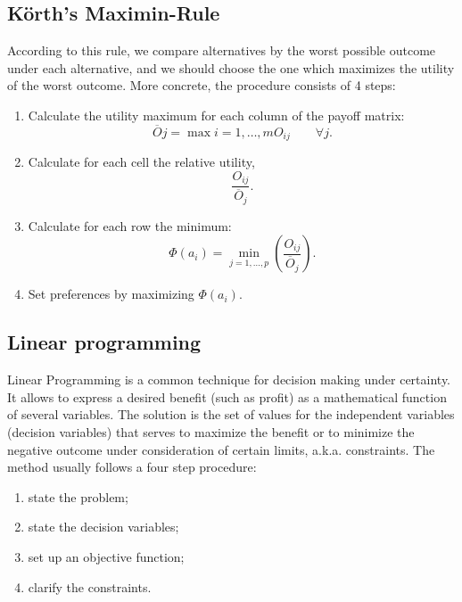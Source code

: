 \documentclass[
  12pt,
  oneside]{book}
\providecommand{\tightlist}{%
  \setlength{\itemsep}{0pt}\setlength{\parskip}{0pt}}
\theoremstyle{definition}
\theoremstyle{definition}
\theoremstyle{definition}
\theoremstyle{definition}
\theoremstyle{remark}
\begin{document}
\hypertarget{kuxf6rths-maximin-rule}{%
\subsection*{Körth's Maximin-Rule}\label{kuxf6rths-maximin-rule}}

According to this rule, we compare alternatives by the worst possible outcome under each alternative, and we should choose the one which maximizes the utility of the worst outcome. More concrete, the procedure consists of 4 steps:

\begin{enumerate}
\def\labelenumi{\arabic{enumi}.}
\tightlist
\item
  Calculate the utility maximum for each column of the payoff matrix: \[\overline{O}j=\max{i=1,\dots,m}{O_{ij}}\qquad \forall j.\]
\item
  Calculate for each cell the relative utility, \[\frac{O_{ij}}{\overline{O}_j}.\]
\item
  Calculate for each row the minimum: \[\Phi(a_i)=\min_{j=1,\dots,p}\left(\frac{O_{ij}}{\overline{O}_j}\right).\]
\item
  Set preferences by maximizing \(\Phi(a_i)\).
\end{enumerate}

\hypertarget{linear-programming}{%
\subsection{Linear programming}\label{linear-programming}}

Linear Programming is a common technique for decision making under certainty. It allows to express a desired benefit (such as profit) as a mathematical function of several variables. The solution is the set of values for the independent variables (decision variables) that serves to maximize the benefit or to minimize the negative outcome under consideration of certain limits, a.k.a. constraints. The method usually follows a four step procedure:

\begin{enumerate}
\def\labelenumi{\arabic{enumi}.}
\tightlist
\item
  state the problem;
\item
  state the decision variables;
\item
  set up an objective function;
\item
  clarify the constraints.
\end{enumerate}
\end{document}
